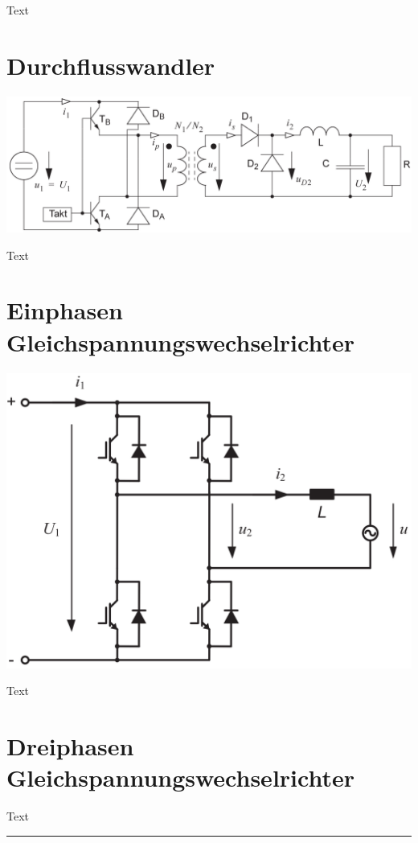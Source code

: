 \documentclass[10pt,landscape]{scrartcl}
\begin{document}
\begin{multicols}{2}
Text

\vfill\null
\columnbreak
\section{Durchflusswandler}

\begin{center}
\includegraphics[width=0.8\linewidth]{img/sch_durchfluss.png}%
\end{center}

Text

\vfill\null
\columnbreak
\section{Einphasen Gleichspannungswechselrichter}

\begin{center}
\includegraphics[width=0.8\linewidth]{img/sch_fullbridge.png}%
\end{center}

Text

\vfill\null
\columnbreak
\section{Dreiphasen Gleichspannungswechselrichter}
Text

\clearpage

\rule{0.3\linewidth}{0.25pt}
%
%
\end{multicols}
\end{document}

